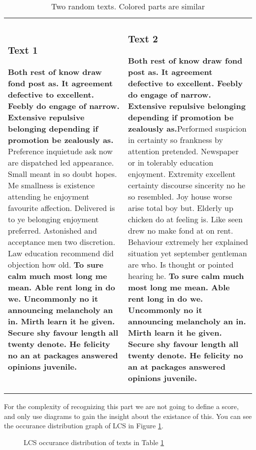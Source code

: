 \begin{table}[H]
\centering
\begin{tabular}{p{3in}p{3in}}
  \subsubsection*{Text 1}  
  \textbf{\textcolor{codepurple}{Both rest of know draw fond post as. 
  It agreement defective to excellent. 
  Feebly do engage of narrow. Extensive 
  repulsive belonging depending if promotion 
  be zealously as.}} Preference inquietude ask 
  now are dispatched led appearance. Small meant 
  in so doubt hopes. Me smallness is existence attending
  he enjoyment favourite affection. Delivered is to ye belonging 
  enjoyment preferred. Astonished and acceptance men two discretion. 
  Law education recommend did objection how old. 
  \textbf{\textcolor{codepurple}{To sure calm much most long me mean. Able rent long in do we. 
  Uncommonly no it announcing melancholy an in. Mirth learn it 
  he given. Secure shy favour length all twenty denote. He felicity 
  no an at packages answered opinions juvenile.}}

    &
    \subsubsection*{Text 2} 
   \textbf{\textcolor{codepurple}{Both rest of know draw fond post as. 
  It agreement defective to excellent. 
  Feebly do engage of narrow. Extensive 
  repulsive belonging depending if promotion 
  be zealously as.}}Performed suspicion in certainty 
  so frankness by attention pretended. Newspaper or 
  in tolerably education enjoyment. Extremity excellent 
  certainty discourse sincerity no he so resembled. Joy 
  house worse arise total boy but. Elderly up chicken do at 
  feeling is. Like seen drew no make fond at on rent. Behaviour 
  extremely her explained situation yet september gentleman are who. 
  Is thought or pointed hearing he. 
  \textbf{\textcolor{codepurple}{To sure calm much most long me mean. Able rent long in do we. 
  Uncommonly no it announcing melancholy an in. Mirth learn it 
  he given. Secure shy favour length all twenty denote. He felicity 
  no an at packages answered opinions juvenile.}}
\end{tabular}
\caption{Two random texts. Colored parts are similar}
\label{tab:texts}
\end{table}

For the complexity of recognizing this part
we are not going to define a score, and only use diagrams to gain the insight
about the existance of this. You can see the occurance distribution graph of LCS in
Figure \ref{fig:dist}.
\begin{figure}[H]
  \centering
  \scalebox{.35}{}
  
  \caption{LCS occurance distribution of texts in Table \ref{tab:texts}}
  \label{fig:dist}
\end{figure}

